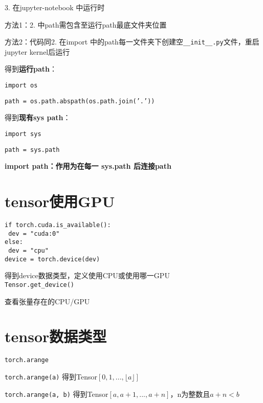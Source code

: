 \documentclass[UTF8]{ctexart}
\begin{document}
  3. 在jupyter-notebook 中运行时

  \quad 方法1：2. 中path需包含至运行path最底文件夹位置

  \quad 方法2：代码同2. 在import 中的path每一文件夹下创建空\texttt{\_\_init\_\_.py}文件，重启jupyter kernel后运行

  得到\textbf{运行path}：

  \quad \texttt{import os}

  \quad \texttt{path = os.path.abspath(os.path.join('.'))}

  得到\textbf{现有sys path}：

  \quad \texttt{import sys}

  \quad \texttt{path = sys.path}

  \textbf{import path：作用为在每一 sys.path 后连接path}


\section{tensor使用GPU}
\noindent \texttt{}
\texttt{if torch.cuda.is\_available():}\\
\texttt{  dev = "cuda:0"}\\
\texttt{else:}\\
\texttt{  dev = "cpu"}\\
\texttt{device = torch.device(dev)}

  得到device数据类型，定义使用CPU或使用哪一GPU\\
\texttt{Tensor.get\_device()}

  查看张量存在的CPU/GPU



\section{tensor数据类型}
\noindent \texttt{torch.arange}

  \texttt{torch.arange(a)} 得到Tensor$[0, 1, ..., \lfloor a \rfloor]$

  \texttt{torch.arange(a, b)} 得到Tensor$[a, a+1, ..., a+n]$，n为整数且$a+n < b$
\end{document}
